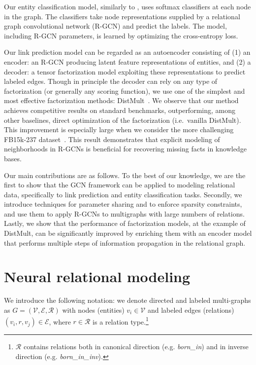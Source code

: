 Our entity classification model, similarly to \citet{kipf2016semi}, uses softmax classifiers at each node in the graph. The classifiers take node representations supplied by a relational graph convolutional network (R-GCN) and predict the labels. The model, including R-GCN parameters, is learned by optimizing the cross-entropy loss.

Our link prediction model can be regarded as an autoencoder consisting of (1) an encoder: an R-GCN producing latent feature representations of entities, and (2) a decoder: a tensor factorization model exploiting these representations to predict labeled edges. Though in principle the decoder can rely on any type of factorization (or generally any scoring function), we use one of the simplest and most effective factorization methods: DistMult~\cite{distmult-embedding_entities_and_relations}. We observe that our method achieves competitive results on standard benchmarks, outperforming, among other baselines, direct optimization of the factorization (i.e.~vanilla DistMult).  This improvement is especially large when we consider the more challenging FB15k-237 dataset~\cite{toutanova2015observed}. This result demonstrates that explicit modeling of neighborhoods in R-GCNs is beneficial for recovering missing facts in knowledge bases.

Our main contributions are as follows. To the best of our knowledge, we are the first to show that the GCN framework can be applied to modeling relational data, specifically to link prediction and entity classification tasks. Secondly, we introduce techniques for parameter sharing and to enforce sparsity constraints, and use them to apply R-GCNs to multigraphs with large numbers of relations. Lastly, we show that the performance of factorization models, at the example of DistMult, can be significantly improved by enriching them with an encoder model that performs multiple steps of information propagation in the relational graph.

\section{Neural relational modeling}
We introduce the following notation: we denote directed and labeled multi-graphs as $G = (\mathcal{V}, \mathcal{E}, \mathcal{R})$ with nodes (entities) $v_i \in \mathcal{V}$ and labeled edges (relations) $(v_i, r, v_j) \in \mathcal{E}$, where $r\in\mathcal{R}$ is a relation type.\footnote{$\mathcal{R}$ contains relations both in canonical direction (e.g. \textit{born\_in}) and in inverse direction (e.g. \textit{born\_in\_inv}).}


